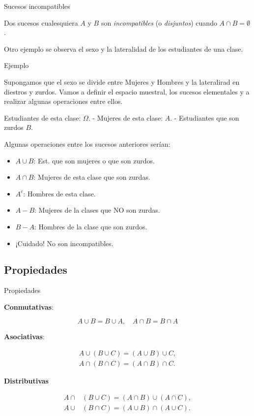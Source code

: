 \documentclass[
  letterpaper,
  DIV=11,
  numbers=noendperiod]{scrreprt}
\providecommand{\tightlist}{%
  \setlength{\itemsep}{0pt}\setlength{\parskip}{0pt}}\usepackage{longtable,booktabs,array}
\begin{document}
Sucesos incompatibles

Dos sucesos cualesquiera \(A\) y \(B\) son \emph{incompatibles} (o
\emph{disjuntos}) cuando \(A\cap B=\emptyset\).

Otro ejemplo se observa el sexo y la lateralidad de los estudiantes de
una clase.

Ejemplo

Supongamos que el sexo se divide entre Mujeres y Hombres y la
lateralirad en diestros y zurdos. Vamos a definir el espacio muestral,
los sucesos elementales y a realizar algunas operaciones entre ellos.

Estudiantes de esta clase: \(\Omega\). - Mujeres de esta clase: \(A\). -
Estudiantes que son zurdos \(B\).

Algunas operaciones entre los sucesos anteriores serían:

\begin{itemize}
\tightlist
\item
  \(A\cup B\): Est. que son mujeres o que son zurdos.
\item
  \(A\cap B\): Mujeres de esta clase que son zurdas.
\item
  \(A^c\): Hombres de esta clase.
\item
  \(A-B\): Mujeres de la clases que NO son zurdas.
\item
  \(B-A\): Hombres de la clase que son zurdos.
\item
  ¡Cuidado! No son incompatibles.
\end{itemize}

\subsection{Propiedades}\label{propiedades}

Propiedades

\textbf{Conmutativas}:

\[A\cup B=B\cup A, \quad A\cap B=B\cap A\]

\textbf{Asociativas}:

\begin{align*}
A\cup(B\cup C)=(A\cup B)\cup C, \\
A\cap(B\cap C)=(A\cap B)\cap C.
\end{align*}

\textbf{Distributivas}

\begin{align*}
A\cap & (B\cup C)=(A\cap B)\cup (A\cap C),\\ 
A\cup & (B\cap C)=(A\cup B)\cap (A\cup C).
\end{align*}
\end{document}
